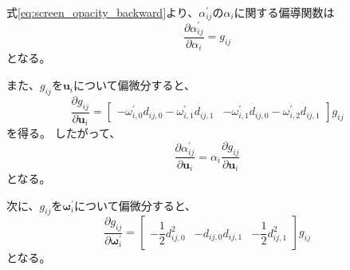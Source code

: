 \documentclass[dvipdfmx]{jlreq}
\begin{document}
式\eqref{eq:screen_opacity_backward}より、$\alpha_{ij}^{\prime}$の$\alpha_i$に関する偏導関数は
\begin{equation}
    \frac{\partial\alpha_{ij}^{\prime}}{\partial\alpha_i} = g_{ij}
    \label{eq:screen_opacity_parameter_derivative}
\end{equation}
となる。

また、$g_{ij}$を$\bm{u}_i$について偏微分すると、
\begin{equation}
    \frac{\partial g_{ij}}{\partial\bm{u}_i} =
    \begin{bmatrix}
        -\omega_{i,0}^{\prime}d_{ij,0} -\omega_{i,1}^{\prime}d_{ij,1} &
        -\omega_{i,1}^{\prime}d_{ij,0} -\omega_{i,2}^{\prime}d_{ij,1}
    \end{bmatrix}
    g_{ij}
    \label{eq:gaussian_weight_position_jacobian}
\end{equation}
を得る。
したがって、
\begin{equation}
    \frac{\partial\alpha_{ij}^{\prime}}{\partial\bm{u}_i} = \alpha_i \frac{\partial g_{ij}}{\partial\bm{u}_i}
    \label{eq:screen_opacity_position_jacobian}
\end{equation}
となる。

次に、$g_{ij}$を$\bm{\omega}_i^{\prime}$について偏微分すると、
\begin{equation}
    \frac{\partial g_{ij}}{\partial\bm{\omega}_i^{\prime}} =
    \begin{bmatrix}
        -\dfrac{1}{2}d_{ij,0}^2 & -d_{ij,0}d_{ij,1} & -\dfrac{1}{2}d_{ij,1}^2
    \end{bmatrix}
    g_{ij}
    \label{eq:gaussian_weight_inverse_covariance_jacobian}
\end{equation}
となる。
\end{document}
